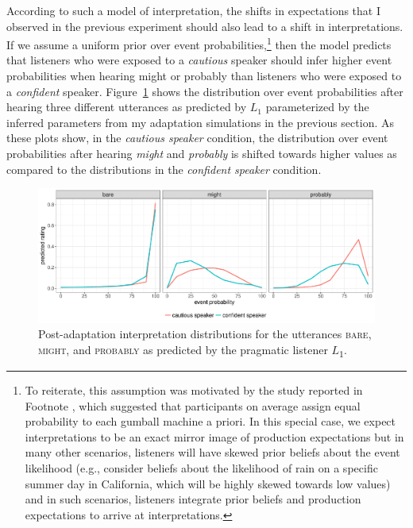 According to such a model of interpretation, the shifts in expectations that I observed in the previous experiment should also lead to a shift in interpretations. 
If we assume a uniform prior over event probabilities,\footnote{To reiterate, this assumption was motivated by the study reported in Footnote , which suggested that participants on average assign equal probability to each gumball machine a priori. In this special case, we expect interpretations to be an exact mirror image of production expectations but in many other scenarios, listeners will have skewed prior beliefs about the event likelihood (e.g., consider beliefs about the likelihood of rain on a specific summer day in California, which will be highly skewed towards low values) and in such scenarios, listeners integrate prior beliefs and  production expectations to arrive at interpretations.} then the model predicts that listeners who were exposed to a \textit{cautious} speaker should infer 
higher event probabilities when hearing {\sc might} or {\sc probably} than listeners who were exposed to a \textit{confident} speaker. Figure~\ref{fig:post-exposure-comp}
shows the distribution over event probabilities after hearing three different utterances as predicted by $L_1$ parameterized by the inferred parameters from my
adaptation simulations in the previous section. As these plots show, in the \textit{cautious speaker} condition, the distribution over event probabilities after hearing \textit{might} 
and \textit{probably} is shifted towards higher values as compared to the distributions in the \textit{confident speaker} condition. 

\begin{figure}
  \includegraphics[width=\textwidth]{plots/fig-13-adaptation-posterior-comp.pdf}
  \caption{Post-adaptation interpretation distributions for the utterances  \textsc{bare}, \textsc{might}, and \textsc{probably} as predicted by the pragmatic listener $L$\textsubscript{$1$}. \label{fig:post-exposure-comp}}
\end{figure}

